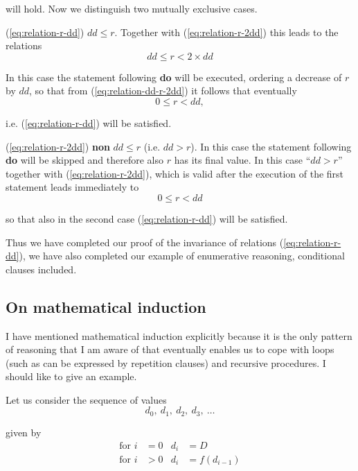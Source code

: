 \documentclass[twoside,11pt]{book}
\begin{document}
\noindent
will hold. Now we distinguish two mutually exclusive cases.

(\ref{eq:relation-r-dd}) $dd \leqslant r$. Together with (\ref{eq:relation-r-2dd}) this leads to the relations
\begin{equation}
	\label{eq:relation-dd-r-2dd}
	dd \leqslant r < 2\times dd
\end{equation}

\noindent
In this case the statement following \textbf{do} will be executed, ordering a decrease of $r$ by $dd$, so that from (\ref{eq:relation-dd-r-2dd}) it follows that eventually
\begin{equation*}
	0 \leqslant r < dd,
\end{equation*}

\noindent
i.e. (\ref{eq:relation-r-dd}) will be satisfied.

(\ref{eq:relation-r-2dd}) \textbf{non} $dd \leqslant r$ (i.e. $dd > r$). In this case the statement following \textbf{do} will be skipped and therefore also $r$ has its final value. In this case ``$dd > r$'' together with (\ref{eq:relation-r-2dd}), which is valid after the execution of the first statement leads immediately to
\begin{equation*}
	0 \leqslant r < dd
\end{equation*}

\noindent
so that also in the second case (\ref{eq:relation-r-dd}) will be satisfied.

Thus we have completed our proof of the invariance of relations (\ref{eq:relation-r-dd}), we have also completed our example of enumerative reasoning, conditional clauses included.

\subsection{On mathematical induction}
\label{subsec:mathematical-induction}

I have mentioned mathematical induction explicitly because it is the only pattern of reasoning that I am aware of that eventually enables us to cope with loops (such as can be expressed by repetition clauses) and recursive procedures. I should like to give an example.

Let us consider the sequence of values
\begin{equation}
	\label{eq:induction-d}
	d_0,\ d_1,\ d_2,\ d_3,\ \dotso
\end{equation}

\noindent
given by
\begin{subequations}
\begin{align}
	\label{eq:induction-for-a}
	\text{for } i &= 0 & d_i &= D \\
	\label{eq:induction-for-b}
	\text{for } i &> 0 & d_i &= f(d_{i-1})
\end{align}
\end{subequations}
\end{document}

